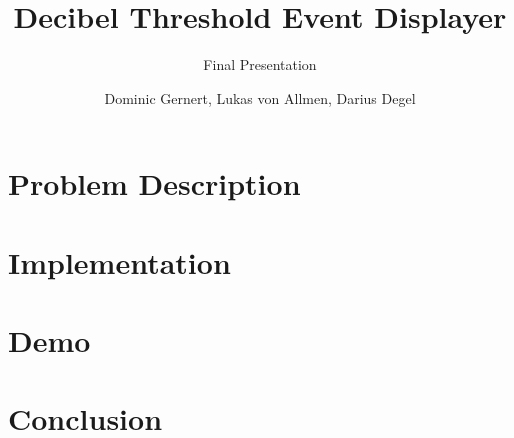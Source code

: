 \documentclass[authorontitle=true]{bfhbeamer}
\title{Decibel Threshold Event Displayer}
\subtitle{Final Presentation}
\author{Dominic Gernert, Lukas von Allmen, Darius Degel}
\begin{document}
    \maketitle
    
    \section{Problem Description}
    
    \section{Implementation}
    
    \section{Demo}
    
    \section{Conclusion}
    
\end{document}
